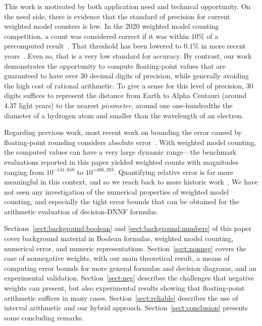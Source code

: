 \documentclass[letterpaper,USenglish,cleveref, autoref, thm-restate]{lipics-v2021}
\begin{document}
This work is motivated by both application need and technical
opportunity.  On the need side, there is evidence that the standard of
precision for current weighted model counters is low.  In the 2020
weighted model counting competition, a count was considered correct if
it was within $10\%$ of a precomputed result~\cite{fichte:jea:2020}.
That threshold has been lowered to $0.1\%$ in more recent
years~\cite{hecher:mc:2024}.  Even so, that is a very low standard for
accuracy.  By contrast, our work demonstrates the opportunity to
compute floating-point values that are guaranteed to have over 30 decimal
digits of precision, while generally avoiding the high cost of
rational arithmetic.  To give a sense for this level of precision,
30 digits suffices to represent the distance from
Earth to Alpha Centauri (around 4.37 light years) to the nearest \emph{picometer},
around one one-hundredths the diameter of a hydrogen atom and smaller than the wavelength of an electron.

Regarding previous work,
most recent work on bounding the error caused by
floating-point rounding considers absolute
error~\cite{becker:fmcad:2016,magron:toms:2017,solovyev:toplas:2018}.
With weighted model counting, the computed values can have a very large dynamic
range---the benchmark evaluations reported in this paper yielded weighted counts with magnitudes ranging from
$10^{-141{,}658}$ to $10^{+466{,}283}$.  
Quantifying relative error is far more meaningful in this context, and so we reach back to
more historic work~\cite{wilkinson:nm:1960,wilkinson:rounding:1964}.
We have not seen any investigation of the numerical properties of weighted model counting, and especially
the tight error bounds that can be obtained for the arithmetic evaluation of decision-DNNF formulas.


Sections~\ref{sect:background:boolean} and
\ref{sect:background:numbers} of this paper cover background material in Boolean
formulas, weighted model counting, numerical error, and numeric
representations.  Section~\ref{sect:nonneg} covers the case of nonnegative weights,
with our main theoretical result,
a means of computing error bounds for more general formulas and decision diagrams,
and an experimental validation.
Section~\ref{sect:neg} describes the challenges that negative
weights can present, but also experimental results showing that
floating-point arithmetic suffices in many cases.
Section~\ref{sect:reliable} describes the use of interval
arithmetic and our hybrid approach.  
Section~\ref{sect:conclusion}
presents some concluding remarks.
\end{document}
